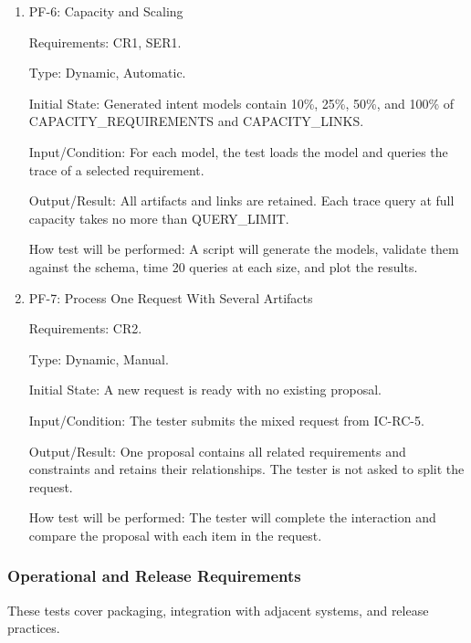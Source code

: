 \documentclass[12pt, titlepage]{article}
\begin{document}
\begin{enumerate}
\item{PF-6: Capacity and Scaling\\}

Requirements: CR1, SER1.

Type: Dynamic, Automatic.

Initial State: Generated intent models contain 10\%, 25\%, 50\%, and 100\% of
CAPACITY\_REQUIREMENTS and CAPACITY\_LINKS.

Input/Condition: For each model, the test loads the model and queries the trace
of a selected requirement.

Output/Result: All artifacts and links are retained. Each trace query at full
capacity takes no more than QUERY\_LIMIT.

How test will be performed: A script will generate the models, validate them
against the schema, time 20 queries at each size, and plot the results.

\item{PF-7: Process One Request With Several Artifacts\\}

Requirements: CR2.

Type: Dynamic, Manual.

Initial State: A new request is ready with no existing proposal.

Input/Condition: The tester submits the mixed request from IC-RC-5.

Output/Result: One proposal contains all related requirements and constraints
and retains their relationships. The tester is not asked to split the request.

How test will be performed: The tester will complete the interaction and compare
the proposal with each item in the request.

\end{enumerate}

\subsubsection{Operational and Release Requirements}

These tests cover packaging, integration with adjacent systems, and release
practices.
\end{document}
